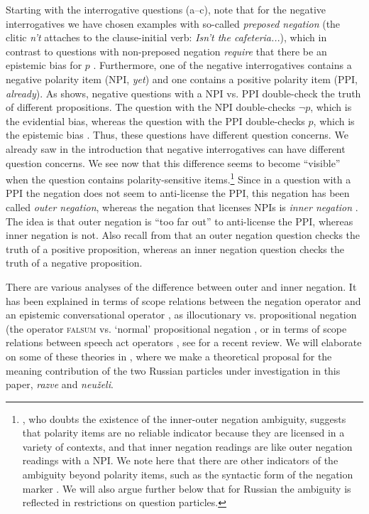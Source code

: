 \documentclass[output=paper,colorlinks,citecolor=brown]{langscibook}
\begin{document}
Starting with the interrogative questions (a--c), note that for the negative interrogatives we have chosen examples with so-called \textit{preposed negation} (the clitic \textit{n't} attaches to the clause-initial verb: \textit{Isn't the cafeteria..}.), which in contrast to questions with non-preposed negation \textit{require} that there be an epistemic bias for $p$ \citep{romerohan2004negative}. Furthermore, one of the negative interrogatives contains a negative polarity item (NPI, \textit{yet}) and one contains a positive polarity item (PPI, \textit{already}). As  shows, negative questions with a NPI vs. PPI double-check the truth of different propositions. The question with the NPI double-checks $\neg p$, which is the evidential bias, whereas the question with the PPI double-checks $p$, which is the epistemic bias \citep{Ladd1981,romerohan2004negative}. Thus, these questions have different question concerns. We already saw in the introduction that negative interrogatives can have different question concerns. We see now that this difference seems to become ``visible'' when the question contains polarity-sensitive items.\footnote[3]{\citet{anderbois_issues_2011, anderbois2019}, who doubts the existence of the inner-outer negation ambiguity, suggests that polarity items are no reliable indicator because they are licensed in a variety of contexts, and that inner negation readings are like outer negation readings with a NPI. We note here that there are other indicators of the ambiguity beyond polarity items, such as the syntactic form of the negation marker \citep{BueGun2000, arnhold2021}. We will also argue further below that for Russian the ambiguity is reflected in restrictions on question particles.} Since in a question with a PPI the negation does not seem to anti-license the PPI, this negation has been called \textit{outer negation}, whereas the negation that licenses NPIs is \textit{inner negation} \citep{Ladd1981,romerohan2004negative}. The idea is that outer negation is ``too far out'' to anti-license the PPI, whereas inner negation is not. Also recall from  that an outer negation question checks the truth of a positive proposition, whereas an inner negation question checks the truth of a negative proposition.

There are various analyses of the difference between outer and inner negation. It has been explained in terms of scope relations between the negation operator and an epistemic conversational operator \citep{romerohan2004negative}, as illocutionary vs. propositional negation (the operator \textsc{falsum} vs. `normal' propositional negation \citep{repp_negation_2009, Repp13}, or in terms of scope relations between speech act operators \citep{reese06, reese_bias_2007, asherreese2005negative, Krifka15, krifka17}, see \citet{romero_form_2020} for a recent review. We will elaborate on some of these theories in , where we make a theoretical proposal for the meaning contribution of the two Russian particles under investigation in this paper, \textit{razve} and \textit{neuželi}.
\end{document}
